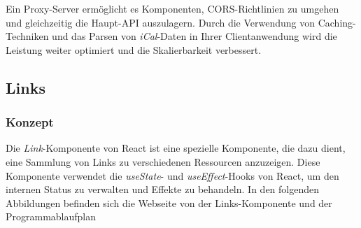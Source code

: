 Ein Proxy-Server ermöglicht es Komponenten, CORS-Richtlinien zu umgehen und gleichzeitig die Haupt-API auszulagern. Durch die Verwendung von Caching-Techniken und das Parsen von \emph{iCal}-Daten in Ihrer Clientanwendung wird die Leistung weiter optimiert und die Skalierbarkeit verbessert.
\newpage
\subsection{Links}
\subsubsection{Konzept}
Die \emph{Link}-Komponente von React ist eine spezielle Komponente, die dazu dient, eine Sammlung von Links zu verschiedenen Ressourcen anzuzeigen. Diese Komponente verwendet die \emph{useState}- und \emph{useEffect}-Hooks von React, um den internen Status zu verwalten und Effekte zu behandeln.
In den folgenden Abbildungen befinden sich die Webseite von der Links-Komponente und der Programmablaufplan
